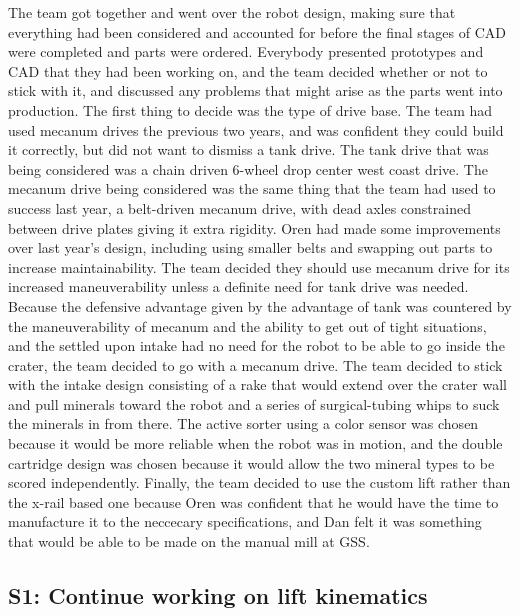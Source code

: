 \documentclass{article}
\begin{document}
The team got together and went over the robot design, making sure that everything had been considered and accounted for before the final stages of CAD were completed and parts were ordered. Everybody presented prototypes and CAD that they had been working on, and the team decided whether or not to stick with it, and discussed any problems that might arise as the parts went into production. The first thing to decide was the type of drive base. The team had used mecanum drives the previous two years, and was confident they could build it correctly, but did not want to dismiss a tank drive. The tank drive that was being considered was a chain driven 6-wheel drop center west coast drive. The mecanum drive being considered was the same thing that the team had used to success last year, a belt-driven mecanum drive, with dead axles constrained between drive plates giving it extra rigidity. Oren had made some improvements over last year's design, including using smaller belts and swapping out parts to increase maintainability. The team decided they should use mecanum drive for its increased maneuverability unless a definite need for tank drive was needed. Because the defensive advantage given by the advantage of tank was countered by the maneuverability of mecanum and the ability to get out of tight situations, and the settled upon intake had no need for the robot to be able to go inside the crater, the team decided to go with a mecanum drive. The team decided to stick with the intake design consisting of a rake that would extend over the crater wall and pull minerals toward the robot and a series of surgical-tubing whips to suck the minerals in from there. The active sorter using a color sensor was chosen because it would be more reliable when the robot was in motion, and the double cartridge design was chosen because it would allow the two mineral types to be scored independently. Finally, the team decided to use the custom lift rather than the x-rail based one because Oren was confident that he would have the time to manufacture it to the neccecary specifications, and Dan felt it was something that would be able to be made on the manual mill at GSS.
\subsection{S1: Continue working on lift kinematics}
\end{document}
